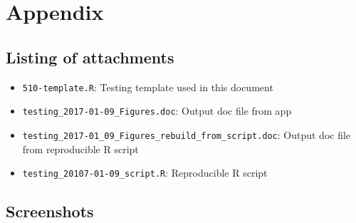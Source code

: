 \documentclass{article}
\newcommand{\testinglog}{testing-log-complete.pdf}
\begin{document}


\newpage


\section*{Appendix}

\subsection*{Listing of attachments}
\begin{itemize}
  \item \verb|510-template.R|: Testing template used in this document
  \item \verb|testing_2017-01-09_Figures.doc|: Output doc file from app
  \item \verb|testing_2017-01_09_Figures_rebuild_from_script.doc|: Output doc file
  from reproducible R script
  \item \verb|testing_20107-01-09_script.R|: Reproducible R script
\end{itemize}

\newpage

\subsection*{Screenshots}




\end{document}
